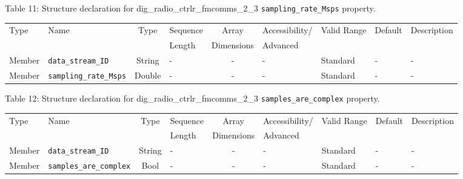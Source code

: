 \documentclass{article}
\def\comp{dig\_radio\_ctrlr\_fmcomms\_2\_3}
\begin{document}
\begin{landscape}
	\noindent Table \hypertarget{tab11}{11}: Structure declaration for \comp{} \verb+sampling_rate_Msps+ property.
	\begin{scriptsize}
		\noindent\begin{longtable}{|p{1.8cm}|p{3.6cm}|c|p{4cm}|c|p{2cm}|p{1.7cm}|p{0.8cm}|p{4.69cm}|}
			\hline
			\rowcolor{blue}
			Type         & Name                                & Type & Sequence & Array      & Accessibility/ & Valid Range  & Default & Description                                                                                                                                                                                                                       \\
			\rowcolor{blue}
			             &                                     &      & Length   & Dimensions & Advanced       &              &         &                                                                                                                                                                                                                             \\
			\hline
			Member       & \verb+data_stream_ID+               & String& -       & -          & -              & Standard     & -       & - \\
			\hline
			Member       & \verb+sampling_rate_Msps+            & Double & -       & -          & -              & Standard & -       & - \\
			\hline
		\end{longtable}
	\end{scriptsize}

	\noindent Table \hypertarget{tab12}{12}: Structure declaration for \comp{} \verb+samples_are_complex+ property.
	\begin{scriptsize}
		\noindent\begin{longtable}{|p{1.8cm}|p{3.6cm}|c|p{4cm}|c|p{2cm}|p{1.7cm}|p{0.8cm}|p{4.81cm}|}
			\hline
			\rowcolor{blue}
			Type         & Name                                & Type & Sequence & Array      & Accessibility/ & Valid Range  & Default & Description                                                                                                                                                                                                                       \\
			\rowcolor{blue}
			             &                                     &      & Length   & Dimensions & Advanced       &              &         &                                                                                                                                                                                                                             \\
			\hline
			Member       & \verb+data_stream_ID+               & String& -       & -          & -              & Standard     & -       & - \\
			\hline
			Member       & \verb+samples_are_complex+           & Bool   & -       & -          & -              & Standard & -       & - \\
			\hline
		\end{longtable}
	\end{scriptsize}


\end{landscape}
\end{document}

